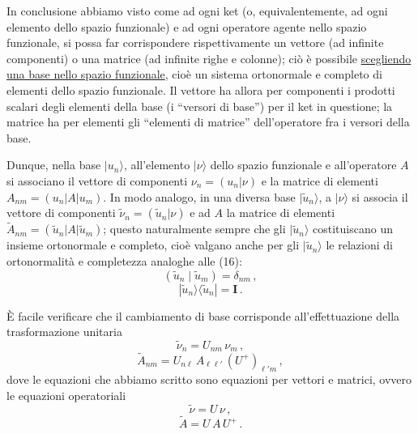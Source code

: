 \documentclass[11pt, a4paper]{book}
\numberwithin{equation}{section}
\begin{document}
In conclusione abbiamo visto come ad ogni ket (o, equivalentemente, ad ogni elemento dello spazio funzionale) e ad ogni operatore agente nello spazio funzionale, si possa far corrispondere rispettivamente un vettore (ad infinite componenti) o una matrice (ad infinite righe e colonne); ciò è possibile \uline{scegliendo una base nello spazio funzionale}, cioè un sistema ortonormale e completo di elementi dello spazio funzionale. Il vettore ha allora per componenti i prodotti scalari degli elementi della base (i ``versori di base'') per il ket in questione; la matrice ha per elementi gli ``elementi di matrice'' dell'operatore fra i versori della base.

Dunque, nella base $|u_n\rangle$, all'elemento $|\nu\rangle$ dello spazio funzionale e all'operatore $A$ si associano il vettore di componenti $\nu_n=(u_n|\nu)$ e la matrice di elementi $A_{nm}=(u_n|A|u_m)$. In modo analogo, in una diversa base $|\tilde{u}_n\rangle$, a $|\nu\rangle$ si associa il vettore di componenti $\tilde{\nu}_n=(\tilde{u}_n|\nu)$ e ad $A$ la matrice di elementi $\tilde{A}_{nm}=(\tilde{u}_n|A|\tilde{u}_m)$; questo naturalmente sempre che gli $|\tilde{u}_n\rangle$ costituiscano un insieme ortonormale e completo, cioè valgano anche per gli $|\tilde{u}_n\rangle$ le relazioni di ortonormalità e completezza analoghe alle (16):
\begin{equation}
(\tilde{u}_n\mid\tilde{u}_m)=\delta_{nm}\,, \tag{18a}
\end{equation}
\begin{equation}
|\tilde{u}_n\rangle\langle\tilde{u}_n|=\mathbf{I}\,. \tag{18b}
\end{equation}

È facile verificare che il cambiamento di base corrisponde all'effettuazione della trasformazione unitaria
\begin{equation}
\tilde{\nu}_n = U_{nm}\,\nu_m\,, \tag{19b}
\end{equation}
\begin{equation}
\tilde{A}_{nm} = U_{n\ell}\,A_{\ell\ell'}\,(U^+)_{\ell' m}\,, \tag{20b}
\end{equation}
dove le equazioni che abbiamo scritto sono equazioni per vettori e matrici, ovvero le equazioni operatoriali
\begin{equation}
\tilde{\nu} = U\,\nu\,, \tag{19a}
\end{equation}
\begin{equation}
\tilde{A} = U\,A\,U^+\,. \tag{20a}
\end{equation}
\end{document}
